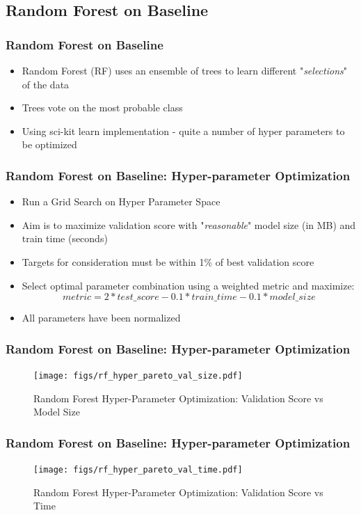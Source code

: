\documentclass{beamer}
\begin{document}
\subsection{Random Forest on Baseline} %
\begin{frame}
\frametitle{Random Forest on Baseline}
\begin{itemize}
	\item Random Forest (RF) uses an ensemble of trees to learn different "\textit{selections}" of the data
	\item Trees vote on the most probable class
	\item Using sci-kit learn implementation - quite a number of hyper parameters to be optimized
\end{itemize}
\end{frame}

\begin{frame}
\frametitle{Random Forest on Baseline: Hyper-parameter Optimization}
\begin{itemize}
	\item Run a Grid Search on Hyper Parameter Space
	\item Aim is to maximize validation score with "\textit{reasonable}" model size (in MB) and train time (seconds)
	\item Targets for consideration must be within 1\% of best validation score
	\item Select optimal parameter combination using a weighted metric and maximize:
	$$
	metric = 2 * test\_score - 0.1*train\_time - 0.1 * model\_size 
	$$
	\item All parameters have been normalized
\end{itemize}
\end{frame}

\begin{frame}
\frametitle{Random Forest on Baseline: Hyper-parameter Optimization}
\begin{figure}
	\texttt{[image: figs/rf\_hyper\_pareto\_val\_size.pdf]}
	\caption{Random Forest Hyper-Parameter Optimization: Validation Score vs Model Size}
\end{figure}
\end{frame}

\begin{frame}
\frametitle{Random Forest on Baseline: Hyper-parameter Optimization}
\begin{figure}
	\texttt{[image: figs/rf\_hyper\_pareto\_val\_time.pdf]}
	\caption{Random Forest Hyper-Parameter Optimization: Validation Score vs Time}
\end{figure}
\end{frame}
\end{document}
